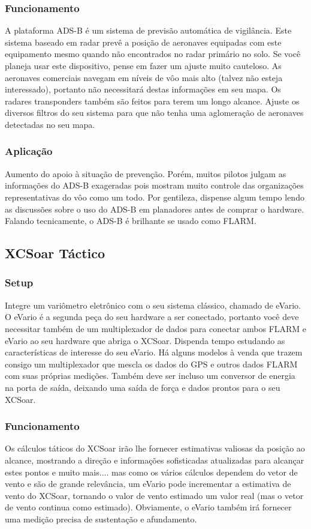 \subsubsection*{Funcionamento} A plataforma ADS-B é um sistema de previsão automática de vigilância.  Este sistema baseado em radar prevê a posição de aeronaves equipadas com este equipamento mesmo quando não encontrados no radar primário no solo.  Se você planeja usar este dispositivo, pense em fazer um ajuste muito cauteloso.  As aeronaves comerciais navegam em níveis de vôo mais alto (talvez não esteja interessado), portanto não necessitará destas informações em seu mapa.  Os radares transponders também são feitos para terem um longo alcance.  Ajuste os diversos filtros do seu sistema para que não tenha uma aglomeração de aeronaves detectadas no seu mapa.

\subsubsection*{Aplicação} Aumento do apoio à situação de prevenção.  Porém, muitos pilotos julgam as informações do ADS-B exageradas pois mostram muito controle das organizações representativas do vôo como um todo.  Por gentileza, dispense algum tempo lendo as discussões sobre o uso do ADS-B em planadores antes de comprar o hardware.  Falando tecnicamente, o ADS-B é brilhante se usado como FLARM.

\subsection*{XCSoar Táctico}
\subsubsection*{Setup} Integre um variômetro eletrônico com o seu sistema clássico, chamado de eVario.  O eVario é a segunda peça do seu hardware a ser conectado, portanto você deve necessitar também de um multiplexador de dados para conectar ambos FLARM e eVario ao seu hardware que abriga o XCSoar.  Dispenda tempo estudando as características de interesse do seu eVario.  Há alguns modelos à venda que trazem consigo um multiplexador que mescla os dados do GPS e outros dados FLARM com suas próprias medições.  Também deve ser incluso um conversor de energia na porta de saída, deixando uma saída de força e dados prontos para o seu XCSoar. 

\subsubsection*{Funcionamento} Os cálculos táticos do XCSoar irão lhe fornecer estimativas valiosas da posição ao alcance, mostrando a direção e informações sofisticadas atualizadas para alcançar estes pontos e muito mais.... mas como os vários cálculos dependem do vetor de vento e são de grande relevância, um eVario pode incrementar a estimativa de vento do XCSoar, tornando o valor de vento estimado um valor real (mas o vetor de vento continua como estimado).  Obviamente, o eVario também irá fornecer uma medição precisa de sustentação e afundamento.

